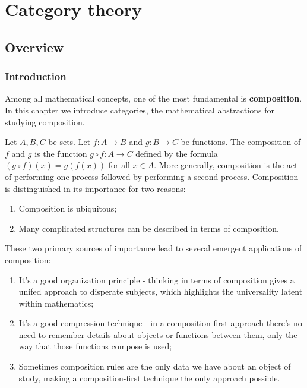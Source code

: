 \section{Category theory}
\label{category-theory}

\subsection{Overview}

\subsubsection{Introduction}

Among all mathematical concepts, one of the most fundamental is \textbf{composition}. In this chapter we introduce categories, the mathematical abstractions for studying composition.

Let $A,B,C$ be sets. Let $f:A\to B$ and $g:B\to C$ be functions. The composition of $f$ and $g$ is the function $g\circ f: A\to C$ defined by the formula $(g\circ f)(x)=g(f(x))$ for all $x\in A$. More generally, composition is the act of performing one process followed by performing a second process. Composition is distinguished in its importance for two reasons:

\begin{enumerate}
\item Composition is ubiquitous;
\item Many complicated structures can be described in terms of composition.
\end{enumerate}

These two primary sources of importance lead to several emergent applications of composition:

\begin{enumerate}
\item It's a good organization principle - thinking in terms of composition gives a unifed approach to disperate subjects, which highlights the universality latent within mathematics;
\item It's a good compression technique - in a composition-first approach there's no need to remember details about objects or functions between them, only the way that those functions compose is used;
\item Sometimes composition rules are the only data we have about an object of study, making a composition-first technique the only approach possible.
\end{enumerate}

